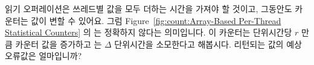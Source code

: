 \QuickQuiz{}
	읽기 오퍼레이션은 쓰레드별 값을 모두 더하는 시간을 가져야 할 것이고,
	그동안도 카운터는 값이 변할 수 있어요.
	그럼 Figure~\ref{fig:count:Array-Based Per-Thread Statistical Counters}
	의   는 정확하지 않다는 의미입니다.
	이 카운터는 단위시간당 $r$ 만큼 카운터 값을 증가하고 
	는 $\Delta$ 단위시간을 소모한다고 해봅시다.
	리턴되는 값의 예상 오류값은 얼마입니까?

